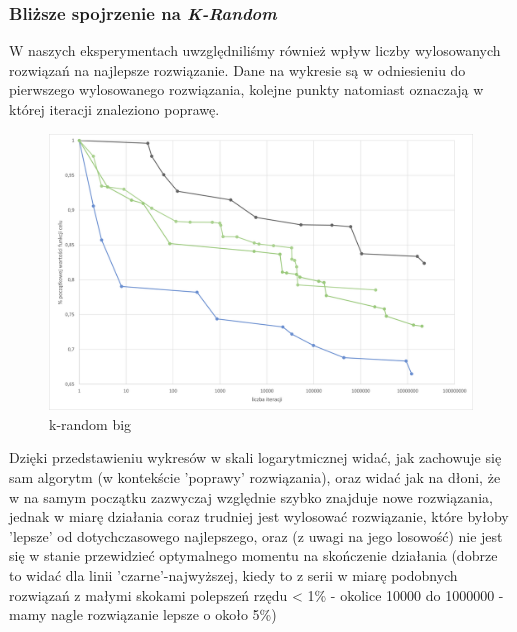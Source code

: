 \documentclass{article}
\begin{document}
\subsubsection{Bliższe spojrzenie na \textit{K-Random}}
W naszych eksperymentach uwzględniliśmy również wpływ liczby wylosowanych rozwiązań na najlepsze rozwiązanie.
Dane na wykresie są w odniesieniu do pierwszego wylosowanego rozwiązania, kolejne punkty natomiast oznaczają w której iteracji znaleziono poprawę.\\
\begin{figure}[H]
\includegraphics[scale=0.7]{k-random.png}
\caption{k-random big}
\end{figure}
Dzięki przedstawieniu wykresów w skali logarytmicznej widać, jak zachowuje się sam algorytm (w kontekście 'poprawy' rozwiązania), oraz widać jak na dłoni, że w na samym początku zazwyczaj względnie szybko znajduje nowe rozwiązania, jednak w miarę działania coraz trudniej jest wylosować rozwiązanie, które byłoby 'lepsze' od dotychczasowego najlepszego, oraz (z uwagi na jego losowość) nie jest się w stanie przewidzieć optymalnego momentu na skończenie działania (dobrze to widać dla linii 'czarne'-najwyższej, kiedy to z serii w miarę podobnych rozwiązań z małymi skokami polepszeń rzędu < 1\% - okolice 10000 do 1000000 - mamy nagle rozwiązanie lepsze o około 5\%)

\newpage
\end{document}
